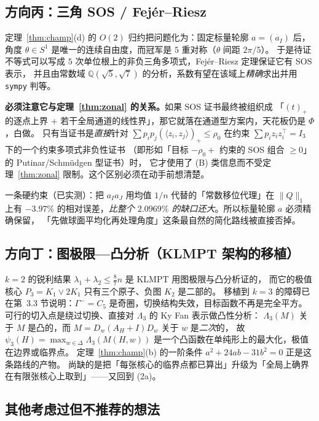\documentclass[UTF8,11pt]{ctexart}
\theoremstyle{definition}
\newcommand{\Lam}{\Lambda}
\newcommand{\Q}{\mathbb{Q}}
\begin{document}
\subsection{方向丙：三角 SOS / Fejér--Riesz}

定理~\ref{thm:champ}(d) 的 $O(2)$ 归约把问题化为：固定标量轮廓 $a=(a_I)$ 后，
角度 $\theta\in S^1$ 是唯一的连续自由度，而冠军是 $5$ 重对称（$\theta$ 间距 $2\pi/5$）。
于是待证不等式可以写成 $5$ 次单位根上的非负三角多项式，Fejér--Riesz 定理保证它有 SOS 表示，
并且由常数域 $\Q(\sqrt5,\sqrt7)$ 的分析，系数有望在该域上\emph{精确}求出并用 \texttt{sympy} 判等。

\textbf{必须注意它与定理~\ref{thm:zonal} 的关系。}如果 SOS 证书最终被组织成
「$(t)_+$ 的逐点上界 + 若干全局通道的线性界」，那它就落在通道型方案内，天花板仍是 $\Phi$，白做。
只有当证书是\emph{直接}针对 $\sum p_ip_j(\langle z_i,z_j\rangle)_+\le\rho_0$
在约束 $\sum p_iz_iz_i^\top=I_3$ 下的一个约束多项式非负性证书
（即形如「目标 $-\rho_0+$ 约束的 SOS 组合 $\ge0$」的 Putinar/Schmüdgen 型证书）时，
它才使用了 (B) 类信息而不受定理~\ref{thm:zonal} 限制。这个区别必须在动手前想清楚。

一条硬约束（已实测）：把 $a_Ia_J$ 用均值 $1/n$ 代替的「常数移位代理」在 $\|Q\|_1$ 上有 $-3.97\%$
的相对误差，\emph{比整个 $2.0969\%$ 的缺口还大}。所以标量轮廓 $a$ 必须精确保留，
「先做球面平均化再处理角度」这条最自然的简化路线被直接否掉。

\subsection{方向丁：图极限—凸分析（KLMPT 架构的移植）}

$k=2$ 的锐利结果 $\lambda_1+\lambda_2\le\frac87n$ 是 KLMPT 用图极限与凸分析证的，
而它的极值核心 $P_3=K_1\vee2K_1$ 只有三个原子、负图 $K_2$ 是二部的。
移植到 $k=3$ 的障碍已在第~3.3 节说明：$\Gamma^-=C_5$ 是奇圈，切换结构失效，目标函数不再是完全平方。
可行的切入点是绕过切换、直接对 $\Lam_3$ 的 Ky Fan 表示做凸性分析：
$\Lam_3(M)$ 关于 $M$ 是凸的，而 $M=D_w(A_H+I)D_w$ 关于 $w$ 是\emph{二次}的，
故 $\psi_3(H)=\max_{w\in\Delta}\Lam_3(M(H,w))$ 是一个凸函数在单纯形上的最大化，极值在边界或临界点。
定理~\ref{thm:champ}(b) 的一阶条件 $a^2+24ab-31b^2=0$ 正是这条路线的产物。
尚缺的是把「每张核心的临界点都已算出」升级为「全局上确界在有限张核心上取到」——又回到 (2a)。

\subsection{其他考虑过但不推荐的想法}
\end{document}
